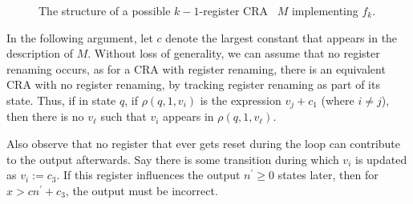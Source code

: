 \documentclass[11pt]{article}
\newcommand{\EDWA}{{CRA}\xspace}
\begin{document}
\begin{figure}
\begin{centering}
\par\end{centering}
\caption{\label{fig:k-var-reqd:MRAA:Mkm1:Structure}The structure of a possible
$k-1$-register \EDWA~ $M$ implementing $f_{k}$.}
\end{figure}

In the following argument, let $c$ denote the largest constant that
appears in the description of $M$.  Without loss of generality, we can
assume that no register renaming occurs, as for a \EDWA with register
renaming, there is an equivalent \EDWA with no register renaming, by
tracking register renaming as part of its state. Thus, if in state
$q$, if $\rho(q,1,v_i)$ is the expression $v_j + c_1$ (where $i\neq
j$), then there is no $v_\ell$ such that $v_i$ appears in
$\rho(q,1,v_\ell)$.

Also observe that no register that ever gets reset during the loop can
contribute to the output afterwards. Say there is some transition
during which $v_{i}$ is updated as $v_{i} := c_{3}$. If this register
influences the output $n^{\prime}\geq0$ states later, then for $x > c
n^{\prime} + c_{3}$, the output must be incorrect.
\end{document}
